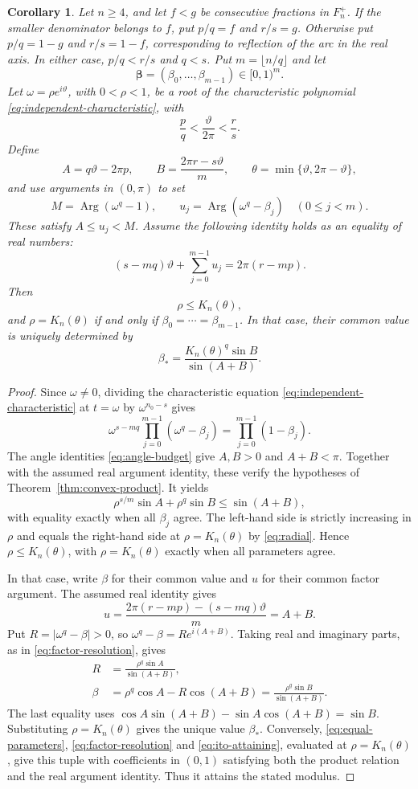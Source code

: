 \documentclass[11pt,a4paper]{article}
\newtheorem{corollary}[theorem]{Corollary}
\theoremstyle{definition}
\theoremstyle{remark}
\numberwithin{equation}{section}
\begin{document}
\begin{corollary}\label{cor:family-equality}
Let $n\ge4$, and let $f<g$ be consecutive fractions in $F_n^+$. If the smaller denominator belongs to $f$, put $p/q=f$ and $r/s=g$. Otherwise put $p/q=1-g$ and $r/s=1-f$, corresponding to reflection of the arc in the real axis. In either case, $p/q<r/s$ and $q<s$.
Put $m=\lfloor n/q\rfloor$ and let
\[
 \boldsymbol\beta=(\beta_0,\ldots,\beta_{m-1})\in[0,1)^m.
\]
Let $\omega=\rho e^{i\vartheta}$, with $0<\rho<1$, be a root of the characteristic polynomial \eqref{eq:independent-characteristic}, with
\[
 \frac pq<\frac{\vartheta}{2\pi}<\frac rs.
\]
Define
\[
 A=q\vartheta-2\pi p,\qquad
 B=\frac{2\pi r-s\vartheta}{m},\qquad
 \theta=\min\{\vartheta,2\pi-\vartheta\},
\]
and use arguments in $(0,\pi)$ to set
\[
 M=\operatorname{Arg}(\omega^q-1),\qquad
 u_j=\operatorname{Arg}(\omega^q-\beta_j)\quad(0\le j<m).
\]
These satisfy $A\le u_j<M$. Assume the following identity holds as an equality of real numbers:
\[
 (s-mq)\vartheta+\sum_{j=0}^{m-1}u_j=2\pi(r-mp).
\]
Then
\[
 \rho\le K_n(\theta),
\]
and $\rho=K_n(\theta)$ if and only if $\beta_0=\cdots=\beta_{m-1}$. In that case, their common value is uniquely determined by
\[
 \beta_* =\frac{K_n(\theta)^q\sin B}{\sin(A+B)}.
\]
\end{corollary}
\begin{proof}
Since $\omega\ne0$, dividing the characteristic equation \eqref{eq:independent-characteristic} at $t=\omega$ by $\omega^{n_0-s}$ gives
\[
 \omega^{s-mq}\prod_{j=0}^{m-1}(\omega^q-\beta_j)
 =\prod_{j=0}^{m-1}(1-\beta_j).
\]
The angle identities \eqref{eq:angle-budget} give $A,B>0$ and $A+B<\pi$. Together with the assumed real argument identity, these verify the hypotheses of Theorem~\ref{thm:convex-product}. It yields
\[
 \rho^{s/m}\sin A+\rho^q\sin B\le\sin(A+B),
\]
with equality exactly when all $\beta_j$ agree. The left-hand side is strictly increasing in $\rho$ and equals the right-hand side at $\rho=K_n(\theta)$ by \eqref{eq:radial}. Hence $\rho\le K_n(\theta)$, with $\rho=K_n(\theta)$ exactly when all parameters agree.

In that case, write $\beta$ for their common value and $u$ for their common factor argument. The assumed real identity gives
\[
 u=\frac{2\pi(r-mp)-(s-mq)\vartheta}{m}=A+B.
\]
Put $R=|\omega^q-\beta|>0$, so $\omega^q-\beta=Re^{i(A+B)}$. Taking real and imaginary parts, as in \eqref{eq:factor-resolution}, gives
\[
 \begin{aligned}
 R&=\frac{\rho^q\sin A}{\sin(A+B)},\\
 \beta&=\rho^q\cos A-R\cos(A+B)
 =\frac{\rho^q\sin B}{\sin(A+B)}.
 \end{aligned}
\]
The last equality uses $\cos A\sin(A+B)-\sin A\cos(A+B)=\sin B$. Substituting $\rho=K_n(\theta)$ gives the unique value $\beta_*$. Conversely, \eqref{eq:equal-parameters}, \eqref{eq:factor-resolution} and \eqref{eq:ito-attaining}, evaluated at $\rho=K_n(\theta)$, give this tuple with coefficients in $(0,1)$ satisfying both the product relation and the real argument identity. Thus it attains the stated modulus.
\end{proof}
\end{document}
